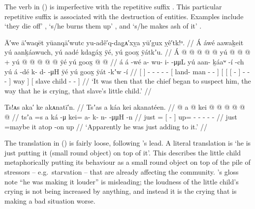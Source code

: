 The verb  in (\lastx) is imperfective with the repetitive suffix .
This particular repetitive suffix is associated with the destruction of entities.
Examples include  ‘they die off’ \parencite[243]{leer:1976},  ‘s/he burns them up’ \parencite[645]{leer:1976}, and  ‘s/he makes ash of it’ \parencite[700]{leer:1976}.

\ex\label{ex:90-69-chief-suspect}%
%
\begingl
	\glpreamble	Ā′we ā′waqēt yūanqā′wutc yu-adê′q-dag̣ᴀ′xỵa yū′gux ỵê′tk!ᵒ. //
	\glpreamble	Á áwé aawaḵeit yú aanḵáawuch, yú aadé kdag̱áx̱ ÿé, yú goox̱ ÿátkʼu. //
	\gla	{} Á {}
		 @ {}
		 @ {} @ {} @ {} @ {}
		{} yú  @ {} @ {} @ {} {} +
		{} yú
			{} {}  @ {} {}
				 @ {} @ {} @ {} @ {} {}
			ÿé {}
		{} yú goox̱  @ {} @ {} {} //
	\glb	{} á {}
		á -wé
		a- wu- i-  -μμL
		{} yú aan- ḵáaʷ -í -ch {}
		{} yú
			{} {} á -dé {}
				k- d-  -μH {} {}
			ÿé {}
		{} yú goox̱ ÿát -kʼw -í {} //
	\glc	{}[  {}]
		 -
		- - -  -
		{}[  land- man - - {}]
		{}[ 
			{}[ {}[  - {}]
				- -  - \· {}]
			way {}]
		{}[  slave child - - {}] //
	\glft	‘It was then that the chief began to suspect him, the way that he is crying, that slave’s little child.’
		//
\endgl
\xe

\ex\label{ex:90-70-adding-to-it}%
%
\begingl
	\glpreamble	Ts!ᴀs aka′ ke akᴀnatī′n. //
	\glpreamble	Tsʼas a káa kei akanatéen. //
	\gla	{} @ {}
		{} a  @ {} {}
		kei @  @ {} @ {} @ {} @ {} @ {} //
	\glb	tsʼa =s
		{} a ká -μ {}
		kei= a- k- n-  -μμH -n //
	\glc	just =
		{}[   - {}]
		up= - - -  - - //
	\gld	just =maybe
		{} it atop -on {}
		up  {} {} {} {} {} //
	\glft	‘Apparently he was just adding to it.’
		//
\endgl
\xe

The translation in (\lastx) is fairly loose, following \citeauthor{swanton:1909}’s lead.
A literal translation is ‘he is just putting it (small round object) on top of it’.
This describes the little child metaphorically putting its behaviour as a small round object on top of the pile of stressors – e.g.\ starvation – that are already affecting the community.
\citeauthor{swanton:1909}’s gloss note “he was making it louder” is misleading; the loudness of the little child’s crying is not being increased by anything, and instead it is the crying that is making a bad situation worse.

